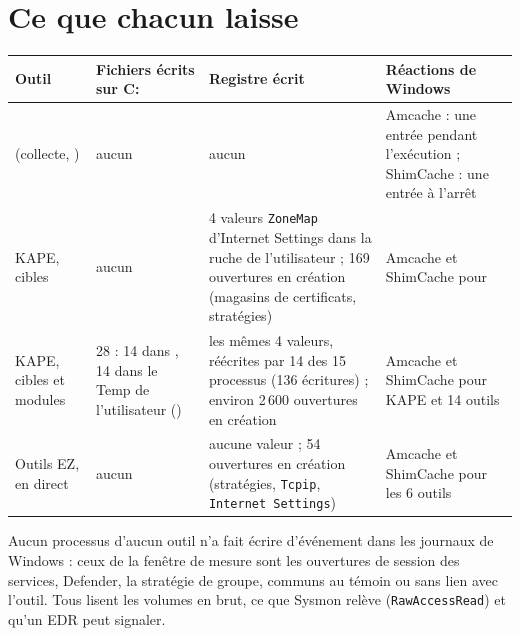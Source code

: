 \documentclass[11pt,a4paper,oneside]{report}
\begin{document}
\section{Ce que chacun laisse}

\begin{longtable}{@{}L{2.5cm}L{3.0cm}L{4.0cm}L{5.5cm}@{}}
\toprule
\textbf{Outil} & \textbf{Fichiers écrits sur C:} & \textbf{Registre écrit} &
  \textbf{Réactions de Windows} \\
\midrule\endhead
\wac{} (collecte, ) & aucun & aucun & Amcache : une entrée pendant
  l'exécution ; ShimCache : une entrée à l'arrêt \\
KAPE, cibles & aucun & 4 valeurs \texttt{ZoneMap} d'Internet Settings dans la
  ruche de l'utilisateur ; 169 ouvertures en création (magasins de
  certificats, stratégies) & Amcache et ShimCache pour  \\
KAPE, cibles et modules & 28 : 14 dans
  , 14 dans le Temp de l'utilisateur
  () & les mêmes 4 valeurs,
  réécrites par 14 des 15 processus (136 écritures) ; environ 2\,600
  ouvertures en création & Amcache et ShimCache pour KAPE et 14 outils \\
Outils EZ, en direct & aucun & aucune valeur ; 54 ouvertures en création
  (stratégies, \texttt{Tcpip}, \texttt{Internet Settings}) & Amcache et
  ShimCache pour les 6 outils \\
\bottomrule
\end{longtable}

Aucun processus d'aucun outil n'a fait écrire d'événement dans les journaux de
Windows : ceux de la fenêtre de mesure sont les ouvertures de session des
services, Defender, la stratégie de groupe, communs au témoin ou sans lien avec
l'outil. Tous lisent les volumes en brut, ce que Sysmon relève
(\texttt{RawAccessRead}) et qu'un EDR peut signaler.
\end{document}
